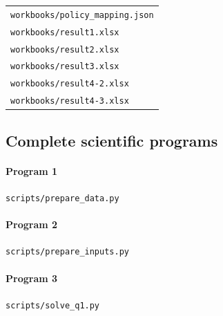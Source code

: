 \begin{longtable}{p{}}
\nolinkurl{workbooks/policy_mapping.json} \\

\nolinkurl{workbooks/result1.xlsx} \\

\nolinkurl{workbooks/result2.xlsx} \\

\nolinkurl{workbooks/result3.xlsx} \\

\nolinkurl{workbooks/result4-2.xlsx} \\

\nolinkurl{workbooks/result4-3.xlsx} \\

\end{longtable}

\endgroup


\subsection*{Complete scientific programs}


\paragraph*{Program 1} \nolinkurl{scripts/prepare_data.py}




\paragraph*{Program 2} \nolinkurl{scripts/prepare_inputs.py}




\paragraph*{Program 3} \nolinkurl{scripts/solve_q1.py}

